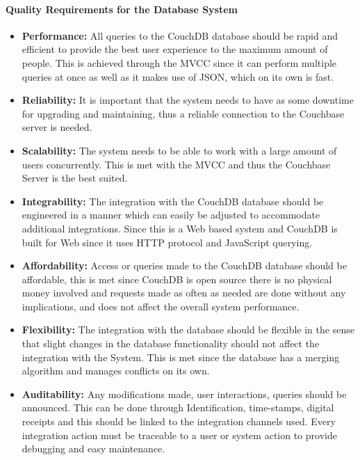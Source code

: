 \documentclass[a4paper]{article}
\begin{document}
	\paragraph{Quality Requirements for the Database System}
	\begin{itemize}
		\item{\textbf{Performance:} All queries to the CouchDB database should be rapid and efficient to provide the best user experience to the maximum amount of people. This is achieved through the MVCC since it can perform multiple queries at once as well as it makes use of JSON, which on its own is fast.}
		\item{\textbf{Reliability:} It is important that the system needs to have as some downtime for upgrading and maintaining, thus a reliable connection to the Couchbase server is needed. }
		\item{\textbf{Scalability:} The system needs to be able to work with a large amount of users concurrently. This is met with the MVCC and thus the Couchbase Server is the best suited.}
		\item{\textbf{Integrability:} The integration with the CouchDB database should be engineered in a manner which can easily be adjusted to accommodate additional integrations. Since this is a Web based system and CouchDB is built for Web since it uses HTTP protocol and JavaScript querying.}
		\item{\textbf{Affordability:} Access or queries made to the CouchDB database should be affordable, this is met since CouchDB is open source there is no physical money involved and requests made as often as needed are done without any implications, and does not affect the overall system performance.}
		\item{\textbf{Flexibility:} The integration with the database should be flexible in the sense that slight changes in the database functionality should not affect the integration with the System. This is met since the database has a merging algorithm and manages conflicts on its own.}
		\item{\textbf{Auditability:} Any modifications made, user interactions, queries should be announced. This can be done through Identification, time-stamps, digital receipts and this should be linked to the integration channels used. Every integration action must be traceable to a user or system action to provide debugging and easy maintenance.}
	\end{itemize}
\end{document}
